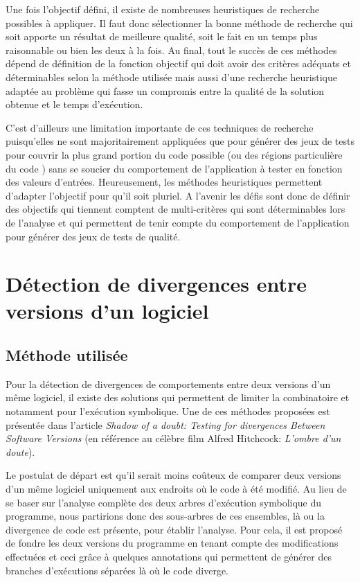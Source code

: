 Une fois l'objectif défini, il existe de nombreuses heuristiques de recherche possibles à appliquer. Il faut donc sélectionner la bonne méthode de recherche qui soit apporte un résultat de meilleure qualité, soit le fait en un temps plus raisonnable ou bien les deux à la fois.
Au final, tout le succès de ces méthodes dépend de définition de la fonction objectif qui doit avoir des critères adéquats et déterminables selon la méthode utilisée mais aussi d'une recherche heuristique adaptée au problème qui fasse un compromis entre la qualité de la solution obtenue et le temps d'exécution.

C'est d'ailleurs une limitation importante de ces techniques de recherche puisqu'elles ne sont majoritairement appliquées que pour générer des jeux de tests pour couvrir la plus grand portion du code possible (ou des régions particulière du code ) sans se soucier du comportement de l'application à tester en fonction des valeurs d'entrées.
Heureusement, les méthodes heuristiques permettent d'adapter l'objectif pour qu'il soit pluriel. A l'avenir les défis sont donc de définir des objectifs qui tiennent comptent de multi-critères qui sont déterminables lors de l'analyse et qui permettent de tenir compte du comportement de l'application pour générer des jeux de tests de qualité.

\section{Détection de divergences entre versions d'un logiciel}

\subsection{Méthode utilisée}
Pour la détection de divergences de comportements entre deux versions d'un même logiciel, il existe des solutions qui permettent de limiter la combinatoire et notamment pour l'exécution symbolique.
Une de ces méthodes proposées est présentée dans l'article \textit{Shadow of a doubt: Testing for divergences Between Software Versions}\cite{shadow} (en référence au célèbre film Alfred Hitchcock: \textit{L'ombre d'un doute}). 

Le postulat de départ est qu'il serait moins coûteux de comparer deux versions d'un même logiciel uniquement aux endroits où le code à été modifié. Au lieu de se baser sur l'analyse complète des deux arbres d'exécution symbolique du programme, nous partirions donc des sous-arbres de ces ensembles, là ou la divergence de code est présente, pour établir l'analyse.
Pour cela, il est proposé de fondre les deux versions du programme en tenant compte des modifications effectuées et ceci grâce à quelques annotations qui permettent de générer des branches d'exécutions séparées là où le code diverge.

